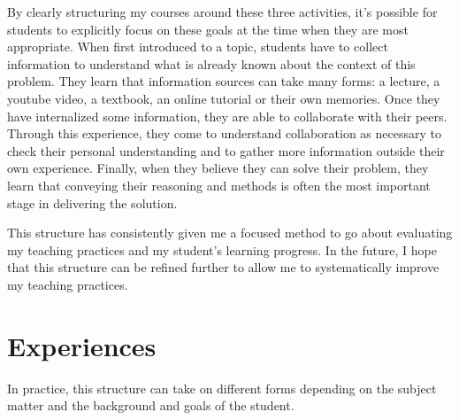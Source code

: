\documentclass[12pt]{amsart} \usepackage{amssymb}
\begin{document}
By clearly structuring my courses around these three activities, it's possible for students to explicitly focus on these goals at the time when they are most appropriate.  When first introduced to a topic, students have to collect information to understand what is already known about the context of this problem. They learn that information sources can take many forms: a lecture, a youtube video, a textbook, an online tutorial or their own memories.  Once they have internalized some information, they are able to collaborate with their peers. Through this experience, they come to understand collaboration as necessary to check their personal understanding and to gather more information outside their own experience.  Finally, when they believe they can solve their problem, they learn that conveying their reasoning and methods is often the most important stage in delivering the solution.  

This structure has consistently given me a focused method to go about evaluating my teaching practices and my student's learning progress.  In the future, I hope that this structure can be refined further to allow me to systematically improve my teaching practices.

\section*{Experiences}
In practice, this structure can take on different forms depending on the subject matter and the background and goals of the student.
   
\end{document}
